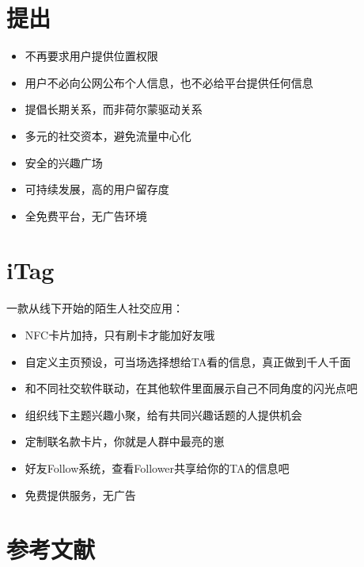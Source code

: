 \documentclass[UTF8]{ctexart}
\begin{document}
\section{提出}
\begin{itemize}
    \item 不再要求用户提供位置权限
    \item 用户不必向公网公布个人信息，也不必给平台提供任何信息
    \item 提倡长期关系，而非荷尔蒙驱动关系
    \item 多元的社交资本，避免流量中心化
    \item 安全的兴趣广场
    \item 可持续发展，高的用户留存度
    \item 全免费平台，无广告环境
\end{itemize}


\section{iTag}
一款从线下开始的陌生人社交应用：

\begin{itemize}
    \item NFC卡片加持，只有刷卡才能加好友哦
    \item 自定义主页预设，可当场选择想给TA看的信息，真正做到千人千面
    \item 和不同社交软件联动，在其他软件里面展示自己不同角度的闪光点吧
    \item 组织线下主题兴趣小聚，给有共同兴趣话题的人提供机会
    \item 定制联名款卡片，你就是人群中最亮的崽
    \item 好友Follow系统，查看Follower共享给你的TA的信息吧~
    \item 免费提供服务，无广告
\end{itemize}


\section{参考文献}



\end{document}
